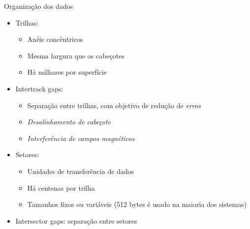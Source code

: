 \begin{slide}{Organização dos dados}
	\begin{itemize}
				\item Trilhas: 
					\begin{itemize}
						\item Anéis concêntricos
						\item Mesma largura que os cabeçotes
						\item Há milhares por superfície
					\end{itemize}
				\item Intertrack gaps: 
					\begin{itemize} 
						\item Separação entre trilhas, com objetivo de redução de \emph{erros}
						\item \emph{Desalinhamento de cabeçote}
						\item \emph{Interferência de campos magnéticos}
					\end{itemize}
				\item Setores: 
					\begin{itemize}
						\item Unidades de transferência de dados
						\item Há centenas por trilha
						\item Tamanhos fixos ou variáveis (512 bytes é usado na maioria dos sistemas)
					\end{itemize}
				\item Intersector gaps: separação entre setores
	\end{itemize}
\end{slide}

